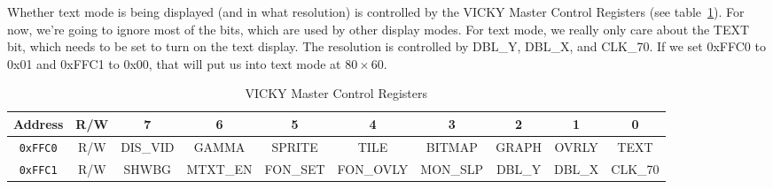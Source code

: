 Whether text mode is being displayed (and in what resolution) is controlled by the VICKY Master Control Registers (see table~\ref{tab:vky_master_ctrl_reg}). For now, we're going to ignore most of the bits, which are used by other display modes. For text mode, we really only care about the TEXT bit, which needs to be set to turn on the text display. The resolution is controlled by DBL\_Y, DBL\_X, and CLK\_70. If we set 0xFFC0 to 0x01 and 0xFFC1 to 0x00, that will put us into text mode at $80 \times 60$.

\begin{table}[ht]
    \begin{center}
        \begin{tabular}{|c|c|c|c|c|c|c|c|c|c|} \hline
            Address & R/W & 7 & 6 & 5 & 4 & 3 & 2 & 1 & 0 \\ \hline\hline
            \verb+0xFFC0+ & R/W & DIS\_VID & GAMMA & SPRITE & TILE & BITMAP & GRAPH & OVRLY & TEXT \\ \hline
            \verb+0xFFC1+ & R/W & SHWBG & MTXT\_EN & FON\_SET & FON\_OVLY & MON\_SLP & DBL\_Y & DBL\_X & CLK\_70 \\ \hline
        \end{tabular}
    \end{center}
    \caption{VICKY Master Control Registers}
    \label{tab:vky_master_ctrl_reg}
\end{table}

